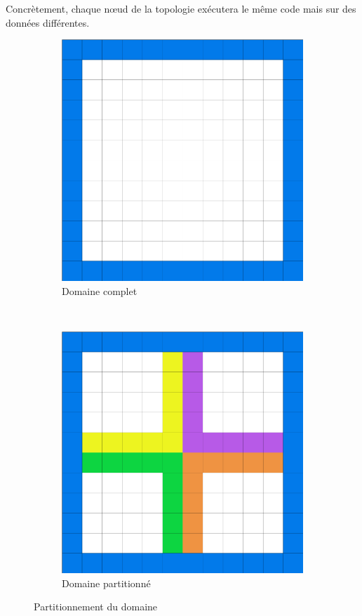 Concrètement, chaque nœud de la topologie exécutera le même code mais sur des données différentes.
\begin{figure}[h!]
  \centering
  \begin{subfigure}[b]{0.5\textwidth}
    \centering
    \includegraphics[scale=0.15]{figures/globaldomain.png}
  \caption{\label{fig:globaldom}Domaine complet}
  \end{subfigure}%
  ~
  \begin{subfigure}[b]{0.5\textwidth}
    \centering
    \includegraphics[scale=0.15]{figures/partitionnedomain.png}
  \caption{\label{fig:partdom}Domaine partitionné}
  \end{subfigure}
  \caption{\label{fig:dom}Partitionnement du domaine}
\end{figure}


